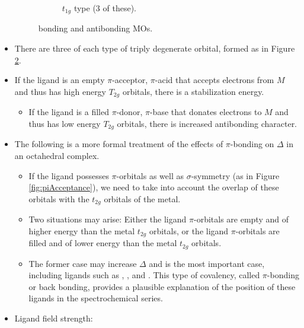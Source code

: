 \documentclass[../notes.tex]{subfiles}
\begin{document}
\begin{itemize}
\begin{figure}[h!]
\begin{subfigure}[b]{0.24\linewidth}
            \caption{$t_{1g}$ type (3 of these).}
            \label{fig:SALCs-ML6d}
        \end{subfigure}
        \caption{ bonding and antibonding MOs.}
        \label{fig:SALCs-ML6}
    \end{figure}
    \item There are three of each type of triply degenerate orbital, formed as in Figure \ref{fig:SALCs-ML6}.
    \item If the ligand is an empty $\pi$-acceptor, $\pi$-acid that accepts electrons from $M$ and thus has high energy $T_{2g}$ orbitals, there is a stabilization energy.
    \begin{itemize}
        \item If the ligand is a filled $\pi$-donor, $\pi$-base that donates electrons to $M$ and thus has low energy $T_{2g}$ orbitals, there is increased antibonding character.
    \end{itemize}
    \item The following is a more formal treatment of the effects of $\pi$-bonding on $\Delta$ in an octahedral complex.
    \begin{itemize}
        \item If the ligand possesses $\pi$-orbitals as well as $\sigma$-symmetry (as in Figure \ref{fig:piAcceptance}), we need to take into account the overlap of these orbitals with the $t_{2g}$ orbitals of the metal.
        \item Two situations may arise: Either the ligand $\pi$-orbitals are empty and of higher energy than the metal $t_{2g}$ orbitals, or the ligand $\pi$-orbitals are filled and of lower energy than the metal $t_{2g}$ orbitals.
        \item The former case may increase $\Delta$ and is the most important case, including ligands such as , , and . This type of covalency, called $\pi$-bonding or back bonding, provides a plausible explanation of the position of these ligands in the spectrochemical series.
    \end{itemize}
    \item Ligand field strength:

\end{itemize}
\end{document}
